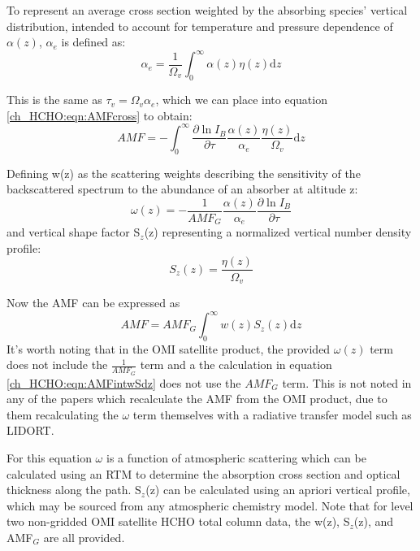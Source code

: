     To represent an average cross section weighted by the absorbing species' vertical distribution, intended to account for temperature and pressure dependence of $\alpha(z)$, $\alpha_e$ is defined as:
    \begin{equation*}
      \alpha_e = \frac{1}{\Omega_v} \int_0^\infty \alpha(z) \eta(z) \mathrm{d}z
    \end{equation*}

    This is the same as $ \tau_v = \Omega_v \alpha_e $, which we can place into equation \ref{ch_HCHO:eqn:AMFcross} to obtain:
    \begin{equation*}
      AMF=-\int_0^\infty{ \frac{\partial \ln{I_B}}{\partial \tau} \frac{\alpha(z)}{\alpha_e} \frac{\eta(z)}{\Omega_v} \mathrm{d}z }
    \end{equation*}

    Defining w(z) as the scattering weights describing the sensitivity of the backscattered spectrum to the abundance of an absorber at altitude z:
    \begin{equation}
      \omega(z) = -\frac{1}{AMF_G} \frac{\alpha(z)}{\alpha_e} \frac{\partial \ln{I_B}}{\partial \tau}
    \end{equation}
    and vertical shape factor S$_z$(z) representing a normalized vertical number density profile: 
    \begin{equation} \label{ch_HCHO:eqn:ShapeFactor}
      S_z(z) = \frac{\eta(z)}{\Omega_v}
    \end{equation}
    
    Now the AMF can be expressed as
    \begin{equation} \label{ch_HCHO:eqn:AMFintwSdz}
      AMF = AMF_G \int_0^\infty w(z) S_z(z) \mathrm{d}z
    \end{equation}
    It's worth noting that in the OMI satellite product, the provided $\omega(z)$ term does not include the $\frac{1}{AMF_G}$ term and a the calculation in equation \ref{ch_HCHO:eqn:AMFintwSdz} does not use the $AMF_G$ term.
    This is not noted in any of the papers which recalculate the AMF from the OMI product, due to them recalculating the $\omega$ term themselves with a radiative transfer model such as LIDORT.
    
    For this equation $\omega$ is a function of atmospheric scattering which can be calculated using an RTM to determine the absorption cross section and optical thickness along the path.
    S$_z$(z) can be calculated using an apriori vertical profile, which may be sourced from any atmospheric chemistry model.
    Note that for level two non-gridded OMI satellite HCHO total column data, the w(z), S$_z$(z), and AMF$_G$ are all provided.
    

